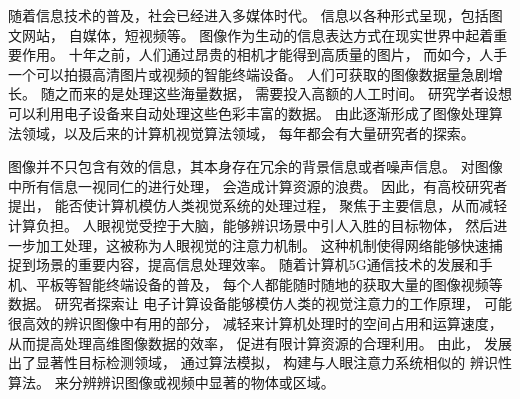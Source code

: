 



%
%
%
%
%
%
%
%
%
%
%





\label{chap:part1}


随着信息技术的普及，社会已经进入多媒体时代。
信息以各种形式呈现，包括图文网站，
自媒体，短视频等。
图像作为生动的信息表达方式在现实世界中起着重要作用。
十年之前，人们通过昂贵的相机才能得到高质量的图片，
而如今，人手一个可以拍摄高清图片或视频的智能终端设备。
人们可获取的图像数据量急剧增长。
随之而来的是处理这些海量数据，
需要投入高额的人工时间。
研究学者设想可以利用电子设备来自动处理这些色彩丰富的数据。
由此逐渐形成了图像处理算法领域，以及后来的计算机视觉算法领域，
每年都会有大量研究者的探索。




图像并不只包含有效的信息，其本身存在冗余的背景信息或者噪声信息。
对图像中所有信息一视同仁的进行处理，
会造成计算资源的浪费。
因此，有高校研究者提出，
能否使计算机模仿人类视觉系统的处理过程，
聚焦于主要信息，从而减轻计算负担。
人眼视觉受控于大脑，能够辨识场景中引人入胜的目标物体，
然后进一步加工处理，这被称为人眼视觉的注意力机制。
这种机制使得网络能够快速捕捉到场景的重要内容，提高信息处理效率。
随着计算机5G通信技术的发展和手机、平板等智能终端设备的普及，
每个人都能随时随地的获取大量的图像视频等数据。
研究者探索让
电子计算设备能够模仿人类的视觉注意力的工作原理，
可能很高效的辨识图像中有用的部分，
减轻来计算机处理时的空间占用和运算速度，
从而提高处理高维图像数据的效率，
促进有限计算资源的合理利用。
由此，
发展出了显著性目标检测领域，
通过算法模拟，
构建与人眼注意力系统相似的
辨识性算法。
来分辨辨识图像或视频中显著的物体或区域。




